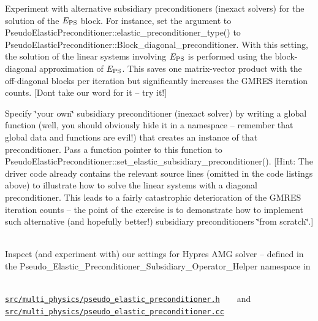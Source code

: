 \begin{DoxyEnumerate}
\item Experiment with alternative subsidiary preconditioners (inexact solvers) for the solution of the $ E_{\rm PS}$ block. For instance, set the argument to {\ttfamily Pseudo\+Elastic\+Preconditioner\+::elastic\+\_\+preconditioner\+\_\+type()} to {\ttfamily Pseudo\+Elastic\+Preconditioner\+::\+Block\+\_\+diagonal\+\_\+preconditioner}. With this setting, the solution of the linear systems involving $ E_{\rm PS}$ is performed using the block-\/diagonal approximation of $ E_{\rm PS}$. This saves one matrix-\/vector product with the off-\/diagonal blocks per iteration but significantly increases the G\+M\+R\+ES iteration counts. \mbox{[}Don\textquotesingle{}t take our word for it -- try it!\mbox{]} ~\newline
~\newline

\item Specify \char`\"{}your own\char`\"{} subsidiary preconditioner (inexact solver) by writing a global function (well, you should obviously hide it in a namespace -- remember that global data and functions are evil!) that creates an instance of that preconditioner. Pass a function pointer to this function to {\ttfamily Pseudo\+Elastic\+Preconditioner\+::set\+\_\+elastic\+\_\+subsidiary\+\_\+preconditioner()}. \mbox{[}Hint\+: The driver code already contains the relevant source lines (omitted in the code listings above) to illustrate how to solve the linear systems with a diagonal preconditioner. This leads to a fairly catastrophic deterioration of the G\+M\+R\+ES iteration counts -- the point of the exercise is to demonstrate how to implement such alternative (and hopefully better!) subsidiary preconditioners \char`\"{}from scratch\char`\"{}.\mbox{]} ~\newline
~\newline

\item Inspect (and experiment with) our settings for Hypre\textquotesingle{}s A\+MG solver -- defined in the {\ttfamily Pseudo\+\_\+\+Elastic\+\_\+\+Preconditioner\+\_\+\+Subsidiary\+\_\+\+Operator\+\_\+\+Helper} namespace in ~\newline
~\newline
 \begin{center} {\ttfamily  \href{../../../../src/multi_physics/pseudo_elastic_preconditioner.h}{\tt src/multi\+\_\+physics/pseudo\+\_\+elastic\+\_\+preconditioner.\+h} } ~\newline
~\newline
 and ~\newline
~\newline
 {\ttfamily  \href{../../../../src/multi_physics/pseudo_elastic_preconditioner.cc}{\tt src/multi\+\_\+physics/pseudo\+\_\+elastic\+\_\+preconditioner.\+cc} } \end{center} 
\end{DoxyEnumerate}

